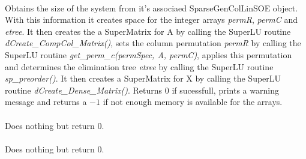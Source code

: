  \\
Obtains the size of the system from it's associaed SparseGenColLinSOE
object. With this information it creates space for the integer arrays
{\em permR}, {\em permC} and {\em etree}. It then creates the
a SuperMatrix for A by calling the SuperLU routine {\em
dCreate\_CompCol\_Matrix()}, sets the column permutation {\em permR}
by calling the SuperLU routine {\em get\_perm\_c(permSpec, A, permC)},
applies this permutation and determines the elimination tree {\em
etree} by calling the SuperLU routine {\em sp\_preorder()}. It then
creates a SuperMatrix for X by calling the SuperLU routine 
{\em dCreate\_Dense\_Matrix()}.
Returns $0$ if sucessfull, prints a warning message and returns
a $-1$ if not enough memory is available for the arrays. \\


 \\ 
Does nothing but return $0$. \\

 \\ 
Does nothing but return $0$. \\








